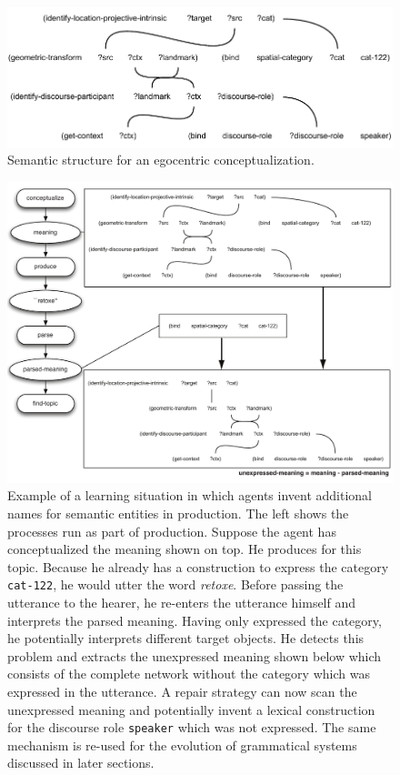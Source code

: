 \begin{figure}[h]
\begin{center}
\includegraphics[width=1.0\columnwidth]{figs/semantic-structure-egocentric-speaker}
\end{center}
\caption{Semantic structure for an egocentric conceptualization.}
\label{f:egocentric-speaker}
\end{figure}
\begin{figure}
\begin{center}
\includegraphics[width=1.0\columnwidth]{figs/mark-unexpressed-meaning}
\end{center}
\caption[Grammatical marker invention]{Example of a learning situation in which agents invent additional names 
for semantic entities in production. The left shows the processes run as 
part of production. Suppose the agent has conceptualized the meaning shown 
on top. He produces for this topic. Because he already has a construction to
express the category {\footnotesize\tt cat-122}, he would utter the word \textit{retoxe}.
Before passing the utterance to the hearer, he re-enters the utterance himself
and interprets the parsed meaning. Having only expressed the category, 
he potentially interprets different target objects.
He detects this problem and extracts the unexpressed meaning shown below which
consists of the complete network without the category which was expressed in
the utterance. A repair strategy can now scan the unexpressed meaning and
potentially invent a lexical construction for the discourse role {\footnotesize\tt speaker}
which was not expressed. The same mechanism is re-used for the evolution of grammatical 
systems discussed in later sections.}
\label{f:marking-unexpressed-meaning}
\end{figure}


